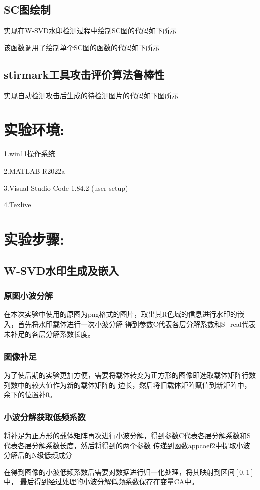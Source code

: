 \documentclass[a4paper,11pt,UTF8]{ctexart}
\begin{document}
\subsection{SC图绘制}
    实现在W-SVD水印检测过程中绘制SC图的代码如下所示
    
    该函数调用了绘制单个SC图的函数的代码如下所示
    
\newpage
\subsection{stirmark工具攻击评价算法鲁棒性}
    实现自动检测攻击后生成的待检测图片的代码如下图所示
    

\section{实验环境:}
  1.win11操作系统\par
  2.MATLAB R2022a\par
  3.Visual Studio Code 1.84.2 (user setup)\par
  4.Texlive


\section{实验步骤:}
  \subsection{W-SVD水印生成及嵌入}
    \subsubsection{原图小波分解}
      在本次实验中使用的原图为png格式的图片，取出其R色域的信息进行水印的嵌入，首先将水印载体进行一次小波分解
      得到参数C代表各层分解系数和S\_real代表未补足的各层分解系数长度。
    \subsubsection{图像补足}
      为了使后期的实验更加方便，需要将载体转变为正方形的图像即选取载体矩阵行数列数中的较大值作为新的载体矩阵的
      边长，然后将旧载体矩阵赋值到新矩阵中，余下的位置补0。
    \subsubsection{小波分解获取低频系数}
      将补足为正方形的载体矩阵再次进行小波分解，得到参数C代表各层分解系数和S代表各层分解系数长度，然后将得到的两个参数
      传递到函数appcoef2中提取小波分解后的N级低频成分\par
      在得到图像的小波低频系数后需要对数据进行归一化处理，将其映射到区间$\left [ 0,1 \right ]$中，
      最后得到经过处理的小波分解低频系数保存在变量CA中。
\end{document}
